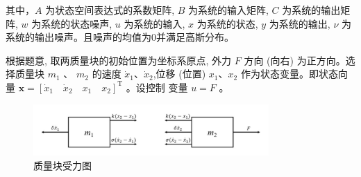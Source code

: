 \documentclass[UTF8]{ctexart}
\begin{document}
  其中，$A$ 为状态空间表达式的系数矩阵, $B$ 为系统的输入矩阵, $C$ 为系统的输出矩阵, $w$ 为系统的状态噪声, $u$ 为系统的输入, $x$ 为系统的状态, $y$ 为系统的输出, $\nu$ 为系统的输出噪声。且噪声的均值为0并满足高斯分布。
  
  根据题意, 取两质量块的初始位置为坐标系原点, 外力 $F$ 方向 (向右) 为正方向。选择质量块 $m_{1}$ 、 $m_{2}$ 的速度 $\dot{x}_{1} 、 \dot{x}_{2}$,位移 (位置) $x_{1} 、 x_{2}$ 作为状态变量。即状态向量 $\boldsymbol{x}=\left[\dot{x}_{1} \quad \dot{x}_{2} \quad x_{1} \quad x_{2}\right]^{\mathrm{T}}$ 。设控制 变量 $u=F$ 。
  \begin{figure}[h]
  \centering
  \includegraphics[width=0.8\textwidth]{figures/force.jpg}
  \caption{质量块受力图}
  \label{fig:force}
  \end{figure}
\end{document}
